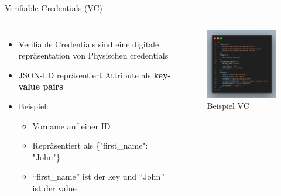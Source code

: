 \documentclass[
	ngerman,%
	authorontitle=true,
	]{bfhbeamer}
\begin{document}
\begin{frame}{Verifiable Credentials (VC)}
    \begin{columns}[onlytextwidth,T]
        \column{70mm}  

    \begin{itemize}
        \item Verifiable Credentials sind eine digitale repräsentation von Physischen credentials
        \item JSON-LD repräsentiert Attribute als \textbf{key-value pairs}
        \item Beispiel:
        \begin{itemize}
            \item Vorname auf einer ID
            \item Repräsentiert als \{"first\_name": "John"\}
            \item ``first\_name'' ist der key und ``John'' ist der value
        \end{itemize}
    \end{itemize}

    \column{70mm}
    \begin{figure}
        \centering
        \includegraphics[width=60mm]{../img/VCSignExample.png}
        \caption{Beispiel VC}
    \end{figure}

    \end{columns}
\end{frame}
\end{document}
